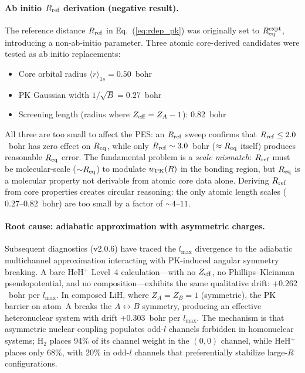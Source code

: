 \documentclass[aps,pra,twocolumn,superscriptaddress,longbibliography,floatfix]{revtex4-2}
\begin{document}
\paragraph{Ab initio $R_{\rm ref}$ derivation (negative result).}
\label{par:rref_negative}
The reference distance $R_{\rm ref}$ in Eq.~(\ref{eq:rdep_pk})
was originally set to $R_{\rm eq}^{\rm expt}$, introducing a
non-ab-initio parameter.  Three atomic core-derived candidates
were tested as ab initio replacements:
\begin{itemize}
  \item Core orbital radius $\langle r \rangle_{1s} = 0.50$~bohr
  \item PK Gaussian width $1/\sqrt{B} = 0.27$~bohr
  \item Screening length (radius where
    $Z_{\rm eff} = Z_A - 1$): 0.82~bohr
\end{itemize}
All three are too small to affect the PES: an $R_{\rm ref}$ sweep
confirms that $R_{\rm ref} \le 2.0$~bohr has zero effect on
$R_{\rm eq}$, while only $R_{\rm ref} \sim 3.0$~bohr
($\approx R_{\rm eq}$ itself) produces reasonable $R_{\rm eq}$
error.  The fundamental problem is a \emph{scale mismatch}:
$R_{\rm ref}$ must be molecular-scale (${\sim}R_{\rm eq}$) to
modulate $w_{\rm PK}(R)$ in the bonding region, but $R_{\rm eq}$
is a molecular property not derivable from atomic core data alone.
Deriving $R_{\rm ref}$ from core properties creates circular
reasoning: the only atomic length scales ($0.27$--$0.82$~bohr) are
too small by a factor of ${\sim}4$--$11$.

\paragraph{Root cause: adiabatic approximation with asymmetric charges.}
Subsequent diagnostics (v2.0.6) have traced the $l_{\max}$ divergence
to the adiabatic multichannel approximation interacting with
PK-induced angular symmetry breaking.  A bare HeH$^+$ Level~4
calculation---with no $Z_{\rm eff}$, no Phillips--Kleinman
pseudopotential, and no composition---exhibits the same qualitative
drift: $+0.262$~bohr per $l_{\max}$.  In composed LiH, where
$Z_A = Z_B = 1$ (symmetric), the PK barrier on atom~A breaks the
$A \leftrightarrow B$ symmetry, producing an effective heteronuclear
system with drift $+0.303$~bohr per $l_{\max}$.  The mechanism is
that asymmetric nuclear coupling populates odd-$l$ channels forbidden
in homonuclear systems; H$_2$ places 94\% of its channel weight in
the $(0{,}0)$ channel, while HeH$^+$ places only 68\%, with 20\% in
odd-$l$ channels that preferentially stabilize large-$R$ configurations.
\end{document}
